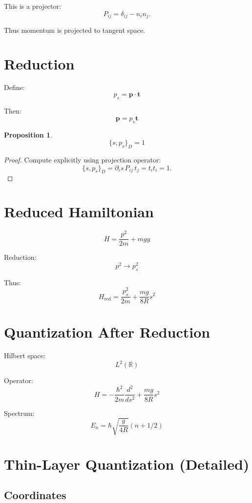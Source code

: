 \documentclass[11pt]{article}
\newtheorem{proposition}{Proposition}
\begin{document}
This is a projector:
\[
P_{ij} = \delta_{ij} - n_i n_j.
\]

Thus momentum is projected to tangent space.

\section{Reduction}

Define:
\[
p_s = \mathbf{p} \cdot \mathbf{t}
\]

Then:
\[
\mathbf{p} = p_s \mathbf{t}
\]

\begin{proposition}
\[
\{s,p_s\}_D = 1
\]
\end{proposition}

\begin{proof}
Compute explicitly using projection operator:
\[
\{s,p_s\}_D = \partial_i s \, P_{ij} \, t_j = t_i t_i = 1.
\]
\end{proof}

\section{Reduced Hamiltonian}

\begin{equation}
H = \frac{p^2}{2m} + mgy
\end{equation}

Reduction:
\[
p^2 \to p_s^2
\]

Thus:
\[
H_{\mathrm{red}} = \frac{p_s^2}{2m} + \frac{mg}{8R}s^2
\]

\section{Quantization After Reduction}

Hilbert space:
\[
L^2(\mathbb{R})
\]

Operator:
\[
H = -\frac{\hbar^2}{2m}\frac{d^2}{ds^2} + \frac{mg}{8R}s^2
\]

Spectrum:
\[
E_n = \hbar \sqrt{\frac{g}{4R}}(n+1/2)
\]

\section{Thin-Layer Quantization (Detailed)}

\subsection{Coordinates}
\end{document}
